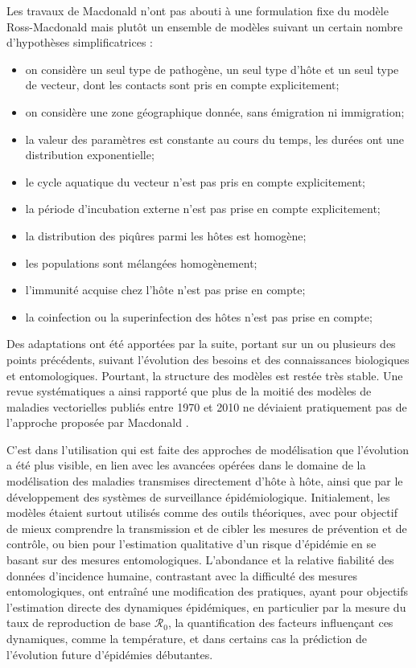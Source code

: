 Les travaux de Macdonald n'ont pas abouti à une formulation fixe du modèle Ross-Macdonald mais plutôt un ensemble de modèles suivant un certain nombre d'hypothèses simplificatrices \cite{smith2012ross} : 
\begin{itemize}
\item on considère un seul type de pathogène, un seul type d'hôte et un seul type de vecteur, dont les contacts sont pris en compte explicitement;
\item on considère une zone géographique donnée, sans émigration ni immigration;
\item la valeur des paramètres est constante au cours du temps, les durées ont une distribution exponentielle;
\item le cycle aquatique du vecteur n'est pas pris en compte explicitement;
\item la période d'incubation externe n'est pas prise en compte explicitement;
\item la distribution des piqûres parmi les hôtes est homogène;
\item les populations sont mélangées homogènement;
\item l'immunité acquise chez l'hôte n'est pas prise en compte;
\item la coinfection ou la superinfection des hôtes n'est pas prise en compte;
\end{itemize}
Des adaptations ont été apportées par la suite, portant sur un ou plusieurs des points précédents, suivant l'évolution des besoins et des connaissances biologiques et entomologiques.
Pourtant, la structure des modèles est restée très stable. 
Une revue systématiques a ainsi rapporté que plus de la moitié des modèles de maladies vectorielles publiés entre 1970 et 2010 ne déviaient pratiquement pas de l'approche proposée par Macdonald \cite{reiner_systematic_2013}.

C'est dans l'utilisation qui est faite des approches de modélisation que l'évolution a été plus visible, en lien avec les avancées opérées dans le domaine de la modélisation des maladies transmises directement d'hôte à hôte, ainsi que par le développement des systèmes de surveillance épidémiologique.
Initialement, les modèles étaient surtout utilisés comme des outils théoriques, avec pour objectif de mieux comprendre la transmission et de cibler les mesures de prévention et de contrôle, ou bien pour l'estimation qualitative d'un risque d'épidémie en se basant sur des mesures entomologiques.
L'abondance et la relative fiabilité des données d'incidence humaine, contrastant avec la difficulté des mesures entomologiques, ont entraîné une modification des pratiques, ayant pour objectifs l'estimation directe des dynamiques épidémiques, en particulier par la mesure du taux de reproduction de base $\mathcal{R}_0$, la quantification des facteurs influençant ces dynamiques, comme la température, et dans certains cas la prédiction de l'évolution future d'épidémies débutantes.

